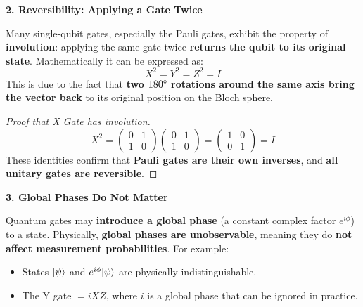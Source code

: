 \highspace
\begin{flushleft}
    \textcolor{Green3}{\textbf{2. Reversibility: Applying a Gate Twice}}
\end{flushleft}
Many single-qubit gates, especially the Pauli gates, exhibit the property of \textbf{involution}: applying the same gate twice \textbf{returns the qubit to its original state}. Mathematically it can be expressed as:
\begin{equation*}
    X^{2} = Y^{2} = Z^{2} = I
\end{equation*}
This is due to the fact that \textbf{two $180\degree$ rotations around the same axis bring the vector back} to its original position on the Bloch sphere.

\begin{proof}[Proof that X Gate has involution]
    \begin{equation*}
        X^{2} =
        \begin{pmatrix}
            0 & 1 \\ 1 & 0
        \end{pmatrix}
        \begin{pmatrix}
            0 & 1 \\ 1 & 0
        \end{pmatrix}
        =
        \begin{pmatrix}
            1 & 0 \\ 0 & 1
        \end{pmatrix}
        =
        I
    \end{equation*}
    These identities confirm that \textbf{Pauli gates are their own inverses}, and \textbf{all unitary gates are reversible}.
\end{proof}

\highspace
\begin{flushleft}
    \textcolor{Green3}{\textbf{3. Global Phases Do Not Matter}}
\end{flushleft}
Quantum gates may \textbf{introduce a global phase} (a constant complex factor $e^{i\phi}$) to a state. Physically, \textbf{global phases are unobservable}, meaning they do \textbf{not affect measurement probabilities}. For example:
\begin{itemize}
    \item States $| \psi \rangle$ and $e^{i\phi}| \psi \rangle$ are physically indistinguishable.
    \item The Y gate $= iXZ$, where $i$ is a global phase that can be ignored in practice. 
\end{itemize}

